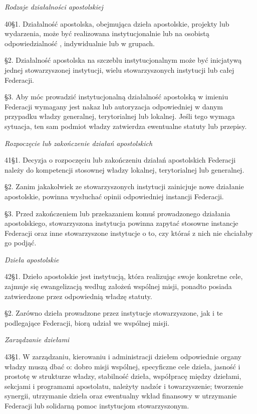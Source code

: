 ﻿\documentclass{book}
\newcommand{\lett}[1]{\lettrine[findent=6pt]{#1}}
\newcommand{\ssec}[1]{\vspace{1em}\textit{#1}\vspace{.5em}\nopagebreak}
\begin{document}
\ssec{Rodzaje działalności apostolskiej}
 
\lett{40} \S{}1. Działalność apostolska, obejmująca dzieła apostolskie, projekty lub wydarzenia, może być realizowana instytucjonalnie lub na osobistą odpowiedzialność , indywidualnie lub w grupach.


\S{}2. Działalność apostolska na szczeblu instytucjonalnym może być inicjatywą jednej stowarzyszonej instytucji, wielu stowarzyszonych instytucji lub całej Federacji.


\S{}3. Aby móc prowadzić instytucjonalną działalność apostolską w imieniu Federacji wymagany jest nakaz lub autoryzacja odpowiedniej w danym przypadku władzy generalnej, terytorialnej lub lokalnej. Jeśli tego wymaga sytuacja, ten sam podmiot władzy zatwierdza ewentualne statuty lub przepisy.
 
\ssec{Rozpoczęcie lub zakończenie działań apostolskich}
 
\lett{41} \S{}1. Decyzja o rozpoczęciu lub zakończeniu działań apostolskich Federacji należy do kompetencji stosownej władzy lokalnej, terytorialnej lub generalnej.


\S{}2. Zanim jakakolwiek ze stowarzyszonych instytucji zainicjuje nowe działanie apostolskie, powinna wysłuchać opinii odpowiedniej instancji Federacji.


\S{}3. Przed zakończeniem lub przekazaniem komuś prowadzonego działania apostolskiego, stowarzyszona instytucja powinna zapytać stosowne instancje Federacji oraz inne stowarzyszone instytucje o to, czy któraś z nich nie chciałaby go podjąć.
 
\ssec{Dzieła apostolskie}
 
\lett{42} \S{}1. Dzieło apostolskie jest instytucją, która realizując swoje konkretne cele, zajmuje się ewangelizacją według założeń wspólnej misji, ponadto posiada zatwierdzone przez odpowiednią władzę statuty.


\S{}2. Zarówno dzieła prowadzone przez instytucje stowarzyszone, jak i te podlegające Federacji, biorą udział we wspólnej misji.
 
\ssec{Zarządzanie dziełami}
 
\lett{43} \S{}1. W zarządzaniu, kierowaniu i administracji dziełem odpowiednie organy władzy muszą dbać o: dobro misji wspólnej, specyficzne cele dzieła, jasność i prostotę w strukturze władzy, stabilność dzieła, współpracę między dziełami, sekcjami i programami apostolatu, należyty nadzór i towarzyszenie; tworzenie synergii, utrzymanie dzieła oraz ewentualny wkład finansowy w utrzymanie Federacji lub solidarną pomoc instytucjom stowarzyszonym.
\end{document}
